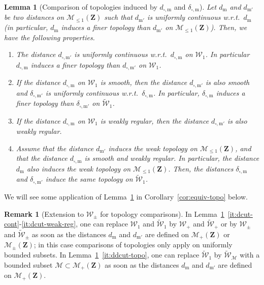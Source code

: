 \documentclass{amsart}
\newcommand{\wrt}{w.r.t.\ }
\theoremstyle{plain}
\newtheorem{lemme}[Th]{Lemma}
\theoremstyle{definition}
\newtheorem{rem}[Th]{Remark}
\newcommand{\Space}{\mathbf{Z}}
\newcommand{\signed}{\pm}
\newcommand{\cm}{\mathcal{M}}
\newcommand{\SubProba}{\mathcal{M}_{\leq1}(\Space)}
\newcommand{\Meas}{\mathcal{M}_+(\Space)}
\newcommand{\SignedMeas}{\mathcal{M}_{\pm}(\Space)}
\newcommand{\Graphon}{\mathcal{W}_1}
\newcommand{\Kernel}{\mathcal{W}_{\signed}}
\newcommand{\Kernelp}{\mathcal{W}_{+}}
\newcommand{\UGraphon}{\widetilde{\mathcal{W}}_1}
\newcommand{\UKernel}{\widetilde{\mathcal{W}}_{\signed}}
\newcommand{\UKernelp}{\widetilde{\mathcal{W}}_{+}}
\newcommand{\UKernelM}{\widetilde{\mathcal{W}}_\cm}
\newcommand{\m}{\mathrm{m}}
\newcommand{\dmeas}{d_\m}
\newcommand{\dcut}{d_{\square,\m}}
\newcommand{\ddcut}{\delta_{\square,\m}}
\newcommand{\mPrime}{\mathrm{m'}}
\newcommand{\dmeasPrime}{d_{\mPrime}}
\newcommand{\dcutPrime}{d_{\square,\mPrime}}
\newcommand{\ddcutPrime}{\delta_{\square,\mPrime}}
\begin{document}
\begin{lemme}[Comparison of topologies induced by $\dcut$ and $\ddcut$]
  \label{lem:unif-cont}
  Let $\dmeas$  and $\dmeasPrime$ be  two distances on  $\SubProba$ such
  that $\dmeasPrime$ is uniformly continuous \wrt $\dmeas$
  (in particular, $\dmeas$ induces a finer topology than $\dmeasPrime$ on $\SubProba$).
    Then, we
  have the following properties. 
\begin{enumerate}[label=(\roman*)]
\item\label{it:dcut-cont}
The distance $\dcutPrime$ is uniformly continuous \wrt $\dcut$ on
$\Graphon$. 
In particular $\dcut$ induces a finer topology than $\dcutPrime$
on $\Graphon$. 
\item\label{it:dcut-smooth}  If the  distance $\dcut$  on $\Graphon$ is
  smooth,  then  the  distance  $\dcutPrime$   is  also  smooth and
  $\ddcutPrime$ is uniformly continuous \wrt $\ddcut$.
  In particular,   $\ddcut$ induces  a finer  topology 
  	than  $\ddcutPrime$ on $\UGraphon$.

\item\label{it:dcut-weak-reg}
If the distance $\dcut$ on $\Graphon$ is
weakly regular, then the distance 
$\dcutPrime$ is also weakly regular.

\item\label{it:ddcut-topo}
  Assume that the distance $\dmeasPrime$ 
	induces the  weak topology on $\SubProba$, and
	that the distance $\dcut$ is smooth and weakly regular.
  In particular, the distance $\dmeas$ also induces the weak topology on $\SubProba$.
Then, the distances $\ddcut$ and $\ddcutPrime$ induce the same topology on $\UGraphon$.
\end{enumerate}
\end{lemme}

We will see some application of Lemma~\ref{lem:unif-cont}
	in Corollary~\ref{cor:equiv-topo} below.
	
\begin{rem}[Extension to $\Kernel$ for topology comparisons]
  \label{rem:extension-pm}
  In Lemma~\ref{lem:unif-cont}~\ref{it:dcut-cont}-\ref{it:dcut-weak-reg}, one can replace
$\Graphon$ and $\UGraphon$ by $\Kernelp$ and $\UKernelp$ or by
 $\Kernel$ and $\UKernel$
as soon as the distances $\dmeas$ and $\dmeasPrime$ are defined on 
$\Meas$ or  $\SignedMeas$;
in this case comparisons of topologies only apply
on uniformly bounded subsets.
In Lemma~\ref{lem:unif-cont}~\ref{it:ddcut-topo},
one can replace $\UGraphon$ by $\UKernelM$
with a bounded subset $\cm \subset \Meas$
as soon as the distances $\dmeas$ and $\dmeasPrime$ are defined on 
$\Meas$.
\end{rem}
 
\end{document}
